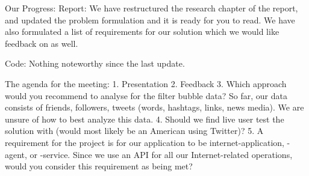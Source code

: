 Our Progress:
Report: We have restructured the research chapter of the report, and updated the problem formulation and it is ready for you to read. We have also formulated a list of requirements for our solution which we would like feedback on as well. 

Code: Nothing noteworthy since the last update.

The agenda for the meeting:
1. Presentation
2. Feedback
3. Which approach would you recommend to analyse for the filter bubble data? So far, our data consists of friends, followers, tweets (words, hashtags, links, news media). We are unsure of how to best analyze this data.
4. Should we find live user test the solution with (would most likely be an American using Twitter)?
5. A requirement for the project is for our application to be internet-application, - agent, or -service. Since we use an API for all our Internet-related operations, would you consider this requirement as being met?
